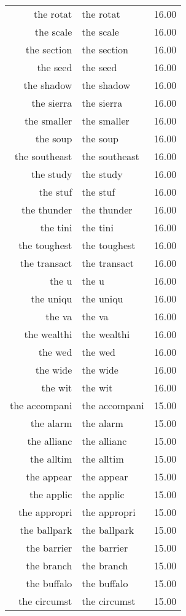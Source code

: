\begin{table}[ht]
\begin{tabular}{rlr}
  the rotat & the rotat & 16.00 \\ 
  the scale & the scale & 16.00 \\ 
  the section & the section & 16.00 \\ 
  the seed & the seed & 16.00 \\ 
  the shadow & the shadow & 16.00 \\ 
  the sierra & the sierra & 16.00 \\ 
  the smaller & the smaller & 16.00 \\ 
  the soup & the soup & 16.00 \\ 
  the southeast & the southeast & 16.00 \\ 
  the study & the study & 16.00 \\ 
  the stuf & the stuf & 16.00 \\ 
  the thunder & the thunder & 16.00 \\ 
  the tini & the tini & 16.00 \\ 
  the toughest & the toughest & 16.00 \\ 
  the transact & the transact & 16.00 \\ 
  the u & the u & 16.00 \\ 
  the uniqu & the uniqu & 16.00 \\ 
  the va & the va & 16.00 \\ 
  the wealthi & the wealthi & 16.00 \\ 
  the wed & the wed & 16.00 \\ 
  the wide & the wide & 16.00 \\ 
  the wit & the wit & 16.00 \\ 
  the accompani & the accompani & 15.00 \\ 
  the alarm & the alarm & 15.00 \\ 
  the allianc & the allianc & 15.00 \\ 
  the alltim & the alltim & 15.00 \\ 
  the appear & the appear & 15.00 \\ 
  the applic & the applic & 15.00 \\ 
  the appropri & the appropri & 15.00 \\ 
  the ballpark & the ballpark & 15.00 \\ 
  the barrier & the barrier & 15.00 \\ 
  the branch & the branch & 15.00 \\ 
  the buffalo & the buffalo & 15.00 \\ 
  the circumst & the circumst & 15.00 \\ 

\end{tabular}
\end{table}

